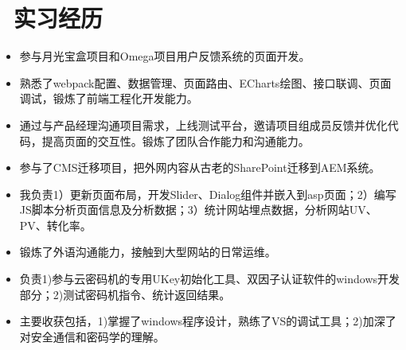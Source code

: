 \documentclass{resume}
\begin{document}
\section{\faBriefcase\ 实习经历}
\begin{itemize}
  \item 参与月光宝盒项目和Omega项目用户反馈系统的页面开发。
  \item 熟悉了webpack配置、数据管理、页面路由、ECharts绘图、接口联调、页面调试，锻炼了前端工程化开发能力。
  \item 通过与产品经理沟通项目需求，上线测试平台，邀请项目组成员反馈并优化代码，提高页面的交互性。锻炼了团队合作能力和沟通能力。
\end{itemize}

\begin{itemize}
  \item 参与了CMS迁移项目，把外网内容从古老的SharePoint迁移到AEM系统。
  \item 我负责1）更新页面布局，开发Slider、Dialog组件并嵌入到asp页面；2）编写JS脚本分析页面信息及分析数据；3）统计网站埋点数据，分析网站UV、PV、转化率。
  \item 锻炼了外语沟通能力，接触到大型网站的日常运维。
\end{itemize}

\begin{itemize}
  \item 负责1)参与云密码机的专用UKey初始化工具、双因子认证软件的windows开发部分；2)测试密码机指令、统计返回结果。
  \item 主要收获包括，1)掌握了windows程序设计，熟练了VS的调试工具；2)加深了对安全通信和密码学的理解。
\end{itemize}
\end{document}
